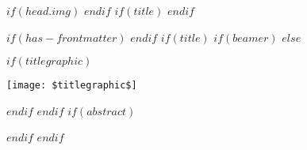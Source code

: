 \pagestyle{fancy}
\fancyhead{} %
\renewcommand{\headrulewidth}{0pt}
$if(head.img)$
$endif$
$if(title)$
$endif$
\sectionfont{\color{odapred}\sectionrule{3ex}{0pt}{-1ex}{0.5pt}} %

\makeatletter
\def\@maketitle{%
  \newpage
  \null
  \vskip 2em%
  \begin{center}%
  \let \footnote \thanks
    {\LARGE \@title \par}%
    \vskip 1em%
	$if(version)$
    {\Large Version $version$\par}%
	$endif$
    \vskip 1.5em%
    {\large
      \lineskip .5em%
      \begin{tabular}[t]{c}%
        \@author
      \end{tabular}\par}%
    \vskip 1em%
    {\large \@date}%
  \end{center}%
  \par
  \vskip 1.5em}
\makeatother

$if(has-frontmatter)$
\frontmatter
$endif$
$if(title)$
$if(beamer)$
\frame{\titlepage}
$else$
{\color{odapred}\maketitle}
\vspace{0.5cm}
$if(titlegraphic)$
\centerline{\texttt{[image: \$titlegraphic\$]}}
\vspace{2cm}
$endif$
$endif$
$if(abstract)$
\begin{abstract}
$abstract$
\end{abstract}
$endif$
$endif$

